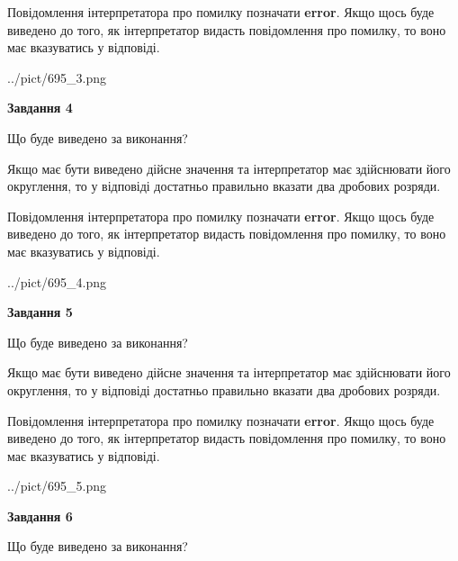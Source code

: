 \documentclass[12pt, ukrainian]{article}
\begin{document}
{\begin {Large}
Повідомлення інтерпретатора про помилку позначати \textbf{error}.
Якщо щось буде виведено до того, як інтерпретатор видасть повідомлення про помилку, 
то воно має вказуватись у відповіді. \par

\begin{center}
	{../pict/695_3.png}
\end{center}
\newpage

{\begin {center}\textbf{Завдання 4}\end {center}}\par
Що буде виведено за виконання? \par

Якщо має бути виведено дійсне значення та інтерпретатор має здійснювати його округлення, 
то у відповіді достатньо правильно вказати два дробових розряди.

Повідомлення інтерпретатора про помилку позначати \textbf{error}.
Якщо щось буде виведено до того, як інтерпретатор видасть повідомлення про помилку, 
то воно має вказуватись у відповіді. \par

\begin{center}
	{../pict/695_4.png}
\end{center}
\newpage

{\begin {center}\textbf{Завдання 5}\end {center}}\par
Що буде виведено за виконання? \par

Якщо має бути виведено дійсне значення та інтерпретатор має здійснювати його округлення, 
то у відповіді достатньо правильно вказати два дробових розряди.

Повідомлення інтерпретатора про помилку позначати \textbf{error}.
Якщо щось буде виведено до того, як інтерпретатор видасть повідомлення про помилку, 
то воно має вказуватись у відповіді. \par

\begin{center}
	{../pict/695_5.png}
\end{center}
\newpage

{\begin {center}\textbf{Завдання 6}\end {center}}\par
Що буде виведено за виконання? \par


\end{Large}}
\end{document}
